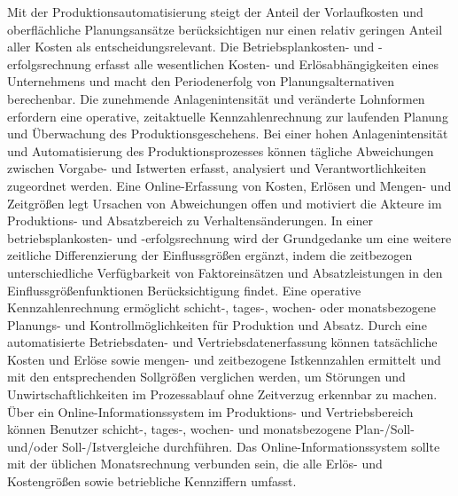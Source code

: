 Mit der Produktionsautomatisierung steigt der Anteil der Vorlaufkosten und oberflächliche Planungsansätze berücksichtigen nur einen relativ geringen Anteil aller Kosten als entscheidungsrelevant. Die Betriebsplankosten- und -erfolgsrechnung erfasst alle wesentlichen Kosten- und Erlösabhängigkeiten eines Unternehmens und macht den Periodenerfolg von Planungsalternativen berechenbar. Die zunehmende Anlagenintensität und veränderte Lohnformen erfordern eine operative, zeitaktuelle Kennzahlenrechnung zur laufenden Planung und Überwachung des Produktionsgeschehens. Bei einer hohen Anlagenintensität und Automatisierung des Produktionsprozesses können tägliche Abweichungen zwischen Vorgabe- und Istwerten erfasst, analysiert und Verantwortlichkeiten zugeordnet werden. Eine Online-Erfassung von Kosten, Erlösen und Mengen- und Zeitgrö{\ss}en legt Ursachen von Abweichungen offen und motiviert die Akteure im Produktions- und Absatzbereich zu Verhaltensänderungen. In einer betriebsplankosten- und -erfolgsrechnung wird der Grundgedanke um eine weitere zeitliche Differenzierung der Einflussgrö{\ss}en ergänzt, indem die zeitbezogen unterschiedliche Verfügbarkeit von Faktoreinsätzen und Absatzleistungen in den Einflussgrö{\ss}enfunktionen Berücksichtigung findet. Eine operative Kennzahlenrechnung ermöglicht schicht-, tages-, wochen- oder monatsbezogene Planungs- und Kontrollmöglichkeiten für Produktion und Absatz. Durch eine automatisierte Betriebsdaten- und Vertriebsdatenerfassung können tatsächliche Kosten und Erlöse sowie mengen- und zeitbezogene Istkennzahlen ermittelt und mit den entsprechenden Sollgrö{\ss}en verglichen werden, um Störungen und Unwirtschaftlichkeiten im Prozessablauf ohne Zeitverzug erkennbar zu machen. Über ein Online-Informationssystem im Produktions- und Vertriebsbereich können  Benutzer schicht-, tages-, wochen- und monatsbezogene Plan-/Soll- und/oder Soll-/Istvergleiche durchführen. Das Online-Informationssystem sollte mit der üblichen Monatsrechnung verbunden sein, die alle Erlös- und Kostengrö{\ss}en sowie betriebliche Kennziffern umfasst.

